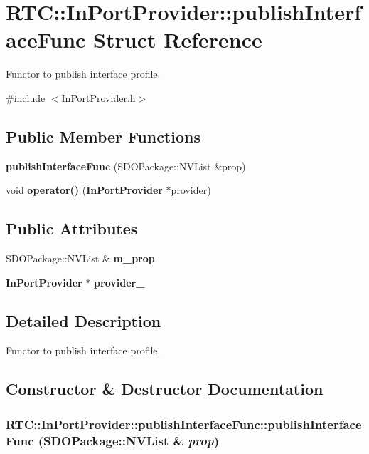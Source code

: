 \section{RTC::InPortProvider::publishInterfaceFunc Struct Reference}
\label{structRTC_1_1InPortProvider_1_1publishInterfaceFunc}


Functor to publish interface profile.  




{\ttfamily \#include $<$InPortProvider.h$>$}

\subsection*{Public Member Functions}
\begin{DoxyCompactItemize}
\item 
{\bf publishInterfaceFunc} (SDOPackage::NVList \&prop)
\item 
void {\bf operator()} ({\bf InPortProvider} $\ast$provider)
\end{DoxyCompactItemize}
\subsection*{Public Attributes}
\begin{DoxyCompactItemize}
\item 
SDOPackage::NVList \& {\bf m\_\-prop}
\item 
{\bf InPortProvider} $\ast$ {\bf provider\_\-}
\end{DoxyCompactItemize}


\subsection{Detailed Description}
Functor to publish interface profile. 

\subsection{Constructor \& Destructor Documentation}
\subsubsection[{publishInterfaceFunc}]{\setlength{\rightskip}{0pt plus 5cm}RTC::InPortProvider::publishInterfaceFunc::publishInterfaceFunc (SDOPackage::NVList \& {\em prop})\hspace{0.3cm}{\ttfamily  [inline]}}\label{structRTC_1_1InPortProvider_1_1publishInterfaceFunc_a0aaf2ad60678f28f706ea8ffa3fb2c28}


